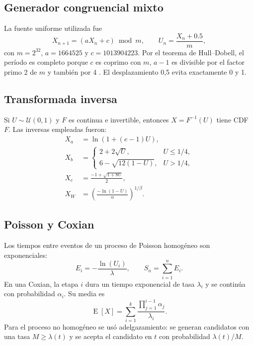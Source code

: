 \documentclass[11pt,a4paper]{article}
\begin{document}
\subsection{Generador congruencial mixto}
La fuente uniforme utilizada fue
\begin{equation}X_{n+1}=(aX_n+c)\bmod m,\qquad U_n=\frac{X_n+0.5}{m},\label{eq:lcg}\end{equation}
con $m=2^{32}$, $a=1664525$ y $c=1013904223$. Por el teorema de Hull--Dobell,
el período es completo porque $c$ es coprimo con $m$, $a-1$ es divisible por el factor
primo 2 de $m$ y también por 4 \cite{ross2013}. El desplazamiento 0,5 evita exactamente 0 y 1.

\subsection{Transformada inversa}
Si $U\sim\mathcal{U}(0,1)$ y $F$ es continua e invertible, entonces $X=F^{-1}(U)$
tiene CDF $F$. Las inversas empleadas fueron:
\begin{align}
 X_a&=\ln(1+(e-1)U),\\
 X_b&=\begin{cases}2+2\sqrt{U},&U\leq1/4,\\6-\sqrt{12(1-U)},&U>1/4,\end{cases}\\
 X_c&=\frac{-1+\sqrt{1+8U}}{2},\\
 X_W&=\left(\frac{-\ln(1-U)}{\alpha}\right)^{1/\beta}.
\end{align}

\subsection{Poisson y Coxian}
Los tiempos entre eventos de un proceso de Poisson homogéneo son exponenciales:
\begin{equation}E_i=-\frac{\ln(U_i)}{\lambda},\qquad S_n=\sum_{i=1}^nE_i.\end{equation}
En una Coxian, la etapa $i$ dura un tiempo exponencial de tasa $\lambda_i$ y se
continúa con probabilidad $\alpha_i$. Su media es
\begin{equation}\operatorname{E}[X]=\sum_{i=1}^{k}\frac{\prod_{j=1}^{i-1}\alpha_j}{\lambda_i}.\label{eq:cox}\end{equation}
Para el proceso no homogéneo se usó adelgazamiento: se generan candidatos con una tasa
$M\geq\lambda(t)$ y se acepta el candidato en $t$ con probabilidad $\lambda(t)/M$.
\end{document}
